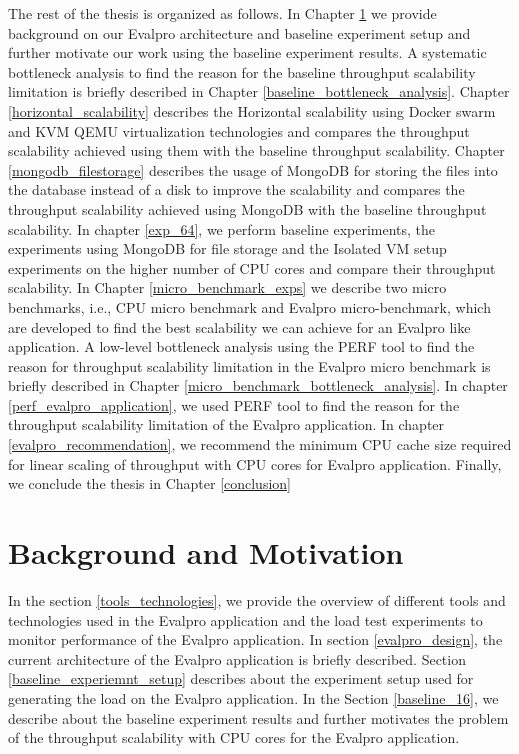 \documentclass{iitbreport}
\begin{document}
The rest of the thesis is organized as follows. In Chapter  \ref{motivation_background} we provide background on our Evalpro architecture and baseline experiment setup and further motivate our work using the baseline experiment results. A systematic bottleneck analysis to find the reason for the baseline throughput scalability limitation is briefly described in Chapter \ref{baseline_bottleneck_analysis}. Chapter \ref{horizontal_scalability} describes the Horizontal scalability using Docker swarm and KVM QEMU virtualization technologies and compares the throughput scalability achieved using them with the baseline throughput scalability. Chapter \ref{mongodb_filestorage} describes the usage of MongoDB for storing the files into the database instead of a disk to improve the scalability and compares the throughput scalability achieved using MongoDB with the baseline throughput scalability. In chapter \ref{exp_64}, we perform baseline experiments, the experiments using MongoDB for file storage and the Isolated VM setup experiments on the higher number of CPU cores and compare their throughput scalability. In Chapter \ref{micro_benchmark_exps} we describe two micro benchmarks, i.e., CPU micro benchmark and Evalpro micro-benchmark, which are developed to find the best scalability we can achieve for an Evalpro like application. A low-level bottleneck analysis using the PERF tool to find the reason for throughput scalability limitation in the Evalpro micro benchmark is briefly described in  Chapter \ref{micro_benchmark_bottleneck_analysis}. In chapter \ref{perf_evalpro_application}, we used PERF tool to find the reason for the throughput scalability limitation of the Evalpro application. In chapter \ref{evalpro_recommendation}, we recommend the minimum CPU cache size required for linear scaling of throughput with CPU cores for Evalpro application. Finally, we conclude the thesis in Chapter \ref{conclusion}

\chapter{Background and Motivation}\label{motivation_background}

In the section \ref{tools_technologies}, we provide the overview of  different tools and technologies used in the Evalpro application and the load test experiments to monitor performance of the Evalpro application. In section \ref{evalpro_design}, the current architecture of  the Evalpro application is briefly described. Section \ref{baseline_experiemnt_setup} describes about the experiment setup used for generating the load on the Evalpro application. In the Section \ref{baseline_16}, we describe about the baseline experiment results and further motivates the problem of the throughput scalability with CPU cores for the Evalpro application.
\end{document}
